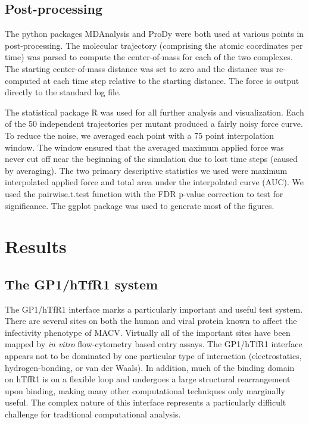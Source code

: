 \documentclass[12pt]{article}
\begin{document}
\subsection*{Post-processing}

The python packages MDAnalysis \citep{Agrawal2011} and ProDy \citep{Bakan2011} were both used at various points in post-processing. The molecular trajectory (comprising the atomic coordinates per time) was parsed to compute the center-of-mass for each of the two complexes. The starting center-of-mass distance was set to zero and the distance was re-computed at each time step relative to the starting distance. The force is output directly to the standard log file.

The statistical package R was used for all further analysis and visualization. Each of the 50 independent trajectories per mutant produced a fairly noisy force curve. To reduce the noise, we averaged each point with a 75 point interpolation window. The window ensured that the averaged maximum applied force was never cut off near the beginning of the simulation due to lost time steps (caused by averaging). The two primary descriptive statistics we used were maximum interpolated applied force and total area under the interpolated curve (AUC). We used the pairwise.t.test function with the FDR p-value correction to test for significance. The ggplot \citep{ggplot} package was used to generate most of the figures. 

\section*{Results}

\subsection*{The GP1/hTfR1 system}
The GP1/hTfR1 interface marks a particularly important and useful test system. There are several sites on both the human and viral protein known to affect the infectivity phenotype of MACV. Virtually all of the important sites have been mapped by \textit{in vitro} flow-cytometry based entry assays. The GP1/hTfR1 interface appears not to be dominated by one particular type of interaction (electrostatics, hydrogen-bonding, or van der Waals). In addition, much of the binding domain on hTfR1 is on a flexible loop and undergoes a large structural rearrangement upon binding, making many other computational techniques \citep{Grant2011,Kortemme2004} only marginally useful. The complex nature of this interface represents a particularly difficult challenge for traditional computational analysis. 
\end{document}
